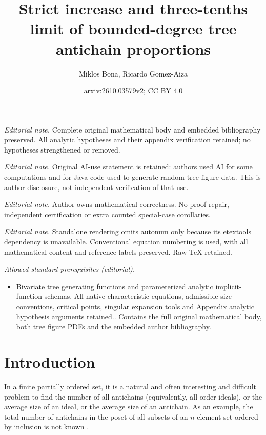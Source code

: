 \documentclass[10pt,a4paper]{amsart}
\title{Strict increase and three-tenths limit of bounded-degree tree antichain proportions}
\author{Miklos Bona, Ricardo Gomez-Aiza}
\date{arxiv:2610.03579v2; CC BY 4.0}
\theoremstyle{remark}
\begin{document}
\maketitle
\noindent\textit{Editorial note.} Complete original mathematical body and embedded bibliography preserved. All analytic hypotheses and their appendix verification retained; no hypotheses strengthened or removed.\par\medskip
\noindent\textit{Editorial note.} Original AI-use statement is retained: authors used AI for some computations and for Java code used to generate random-tree figure data. This is author disclosure, not independent verification of that use.\par\medskip
\noindent\textit{Editorial note.} Author owns mathematical correctness. No proof repair, independent certification or extra counted special-case corollaries.\par\medskip
\noindent\textit{Editorial note.} Standalone rendering omits autonum only because its etextools dependency is unavailable. Conventional equation numbering is used, with all mathematical content and reference labels preserved. Raw TeX retained.\par\medskip
\noindent\textit{Allowed standard prerequisites (editorial).}\begin{itemize}
\item Bivariate tree generating functions and parameterized analytic implicit-function schemas. All native characteristic equations, admissible-size conventions, critical points, singular expansion tools and Appendix analytic hypothesis arguments retained.. Contains the full original mathematical body, both tree figure PDFs and the embedded author bibliography.
\end{itemize}\medskip
\section{Introduction}
In a finite partially ordered set, it is a natural and often interesting and difficult problem to find the number of all antichains (equivalently, all order ideals), or the average size of an ideal, or the average size of an antichain. As an example, the total number of antichains in the poset of all subsets of an $n$-element set
ordered by inclusion is not known \cite{JenssenMalekshahianPark}.
\end{document}
